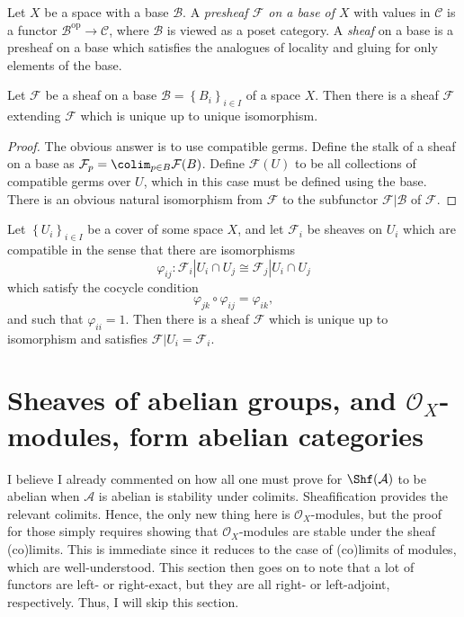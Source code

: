 \begin{definition}\label{dfn:2-5-1}
	Let $X$ be a space with a base $\mathcal{B} $. A \emph{presheaf $\mathcal{F} $ on a base of $X$} with values in $\mathcal{C} $ is a functor $\mathcal{B}^{\mathrm{op}} \to \mathcal{C} $, where $\mathcal{B} $ is viewed as a poset category. A \emph{sheaf} on a base is a presheaf on a base which satisfies the analogues of locality and gluing for only elements of the base.
\end{definition}

\begin{theorem}\label{thm:2-5-2}
	Let $\mathcal{F} $ be a sheaf on a base $\mathcal{B} =\left\{ B_i \right\} _{i\in I} $ of a space $X$. Then there is a sheaf $\mathscr{F} $ extending $\mathcal{F} $ which is unique up to unique isomorphism.
\end{theorem}
\begin{proof}
	The obvious answer is to use compatible germs. Define the stalk of a sheaf on a base as $\mathcal{F} _p = \colim_{p\in B} \mathcal{F} (B)$. Define $\mathscr{F} (U)$ to be all collections of compatible germs over $U$, which in this case must be defined using the base. There is an obvious natural isomorphism from $\mathcal{F} $ to the subfunctor $\mathscr{F} |\mathcal{B}$ of $\mathscr{F} $.
\end{proof}


\begin{exercise}
	Let $\left\{ U_i \right\} _{i\in I} $ be a cover of some space $X$, and let $\mathcal{F} _i$ be sheaves on $U_i$ which are compatible in the sense that there are isomorphisms
	\[
		\varphi _{ij} : \mathcal{F}_i|U_i \cap U_j \cong \mathcal{F} _j|U_i \cap U_j
	\]
	which satisfy the cocycle condition
	\[
		\varphi _{jk} \circ \varphi _{ij} =\varphi _{ik} ,
	\]
	and such that $\varphi _{ii} =1$. Then there is a sheaf $\mathcal{F} $ which is unique up to isomorphism and satisfies $\mathcal{F} |U_i = \mathcal{F} _i$.
\end{exercise}

\section{Sheaves of abelian groups, and $\mathcal{O} _X$-modules, form abelian categories}

I believe I already commented on how all one must prove for $\Shf (\mathcal{A} )$ to be abelian when $\mathcal{A} $ is abelian is stability under colimits. Sheafification provides the relevant colimits. Hence, the only new thing here is $\mathcal{O} _X$-modules, but the proof for those simply requires showing that $\mathcal{O} _X$-modules are stable under the sheaf (co)limits. This is immediate since it reduces to the case of (co)limits of modules, which are well-understood. This section then goes on to note that a lot of functors are left- or right-exact, but they are all right- or left-adjoint, respectively. Thus, I will skip this section.

